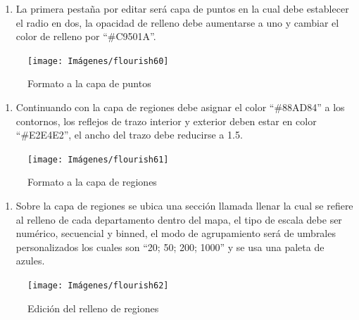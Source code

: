 \documentclass[
]{book}
\providecommand{\tightlist}{%
  \setlength{\itemsep}{0pt}\setlength{\parskip}{0pt}}
\begin{document}
\begin{enumerate}
\def\labelenumi{\arabic{enumi}.}
\tightlist
\item
  La primera pestaña por editar será capa de puntos en la cual debe establecer el radio en dos, la opacidad de relleno debe aumentarse a uno y cambiar el color de relleno por ``\#C9501A''.
\end{enumerate}

\begin{figure}

{\centering \texttt{[image: Imágenes/flourish60]} 

}

\caption{Formato a la capa de puntos}\label{fig:paso1mapadeptosflourish-fig}
\end{figure}

\begin{enumerate}
\def\labelenumi{\arabic{enumi}.}
\setcounter{enumi}{1}
\tightlist
\item
  Continuando con la capa de regiones debe asignar el color ``\#88AD84'' a los contornos, los reflejos de trazo interior y exterior deben estar en color ``\#E2E4E2'', el ancho del trazo debe reducirse a 1.5.
\end{enumerate}

\begin{figure}

{\centering \texttt{[image: Imágenes/flourish61]} 

}

\caption{Formato a la capa de regiones}\label{fig:paso2mapadeptosflourish-fig}
\end{figure}

\begin{enumerate}
\def\labelenumi{\arabic{enumi}.}
\setcounter{enumi}{2}
\tightlist
\item
  Sobre la capa de regiones se ubica una sección llamada llenar la cual se refiere al relleno de cada departamento dentro del mapa, el tipo de escala debe ser numérico, secuencial y binned, el modo de agrupamiento será de umbrales personalizados los cuales son ``20; 50; 200; 1000'' y se usa una paleta de azules.
\end{enumerate}

\begin{figure}

{\centering \texttt{[image: Imágenes/flourish62]} 

}

\caption{Edición del relleno de regiones}\label{fig:paso3mapadeptosflourish-fig}
\end{figure}
\end{document}
